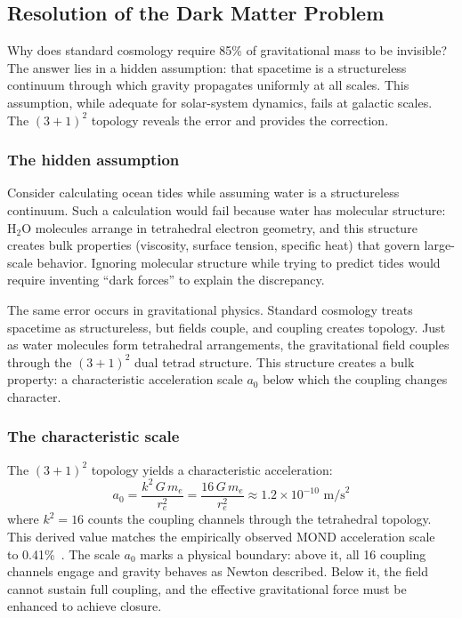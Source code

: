 \documentclass[aps,prd,preprint,superscriptaddress,showpacs,preprintnumbers,amsmath,amssymb,nofootinbib]{revtex4-2}
\begin{document}
\subsection{Resolution of the Dark Matter Problem}
\label{subsec:darkmatter}

Why does standard cosmology require 85\% of gravitational mass to be invisible? The answer lies in a hidden assumption: that spacetime is a structureless continuum through which gravity propagates uniformly at all scales. This assumption, while adequate for solar-system dynamics, fails at galactic scales. The $(3+1)^2$ topology reveals the error and provides the correction.

\subsubsection*{The hidden assumption}

Consider calculating ocean tides while assuming water is a structureless continuum. Such a calculation would fail because water has molecular structure: $\text{H}_2\text{O}$ molecules arrange in tetrahedral electron geometry, and this structure creates bulk properties (viscosity, surface tension, specific heat) that govern large-scale behavior. Ignoring molecular structure while trying to predict tides would require inventing ``dark forces'' to explain the discrepancy.

The same error occurs in gravitational physics. Standard cosmology treats spacetime as structureless, but fields couple, and coupling creates topology. Just as water molecules form tetrahedral arrangements, the gravitational field couples through the $(3+1)^2$ dual tetrad structure. This structure creates a bulk property: a characteristic acceleration scale $a_0$ below which the coupling changes character.

\subsubsection*{The characteristic scale}

The $(3+1)^2$ topology yields a characteristic acceleration:
\begin{equation}
a_0 = \frac{k^2 \, G \, m_e}{r_e^2} = \frac{16 \, G \, m_e}{r_e^2} \approx 1.2 \times 10^{-10} \text{ m/s}^2
\label{eq:a0-dm}
\end{equation}
where $k^2 = 16$ counts the coupling channels through the tetrahedral topology. This derived value matches the empirically observed MOND acceleration scale~\cite{milgrom1983} to 0.41\%~\cite{paper5}. The scale $a_0$ marks a physical boundary: above it, all 16 coupling channels engage and gravity behaves as Newton described. Below it, the field cannot sustain full coupling, and the effective gravitational force must be enhanced to achieve closure.
\end{document}

